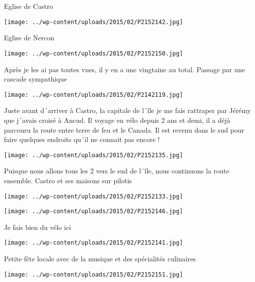  \newline
 Eglise de Castro \newline
 \newline
\centerline{\texttt{[image: ../wp-content/uploads/2015/02/P2152142.jpg]} } 
 \newline
 Eglise de Nercon \newline
 \newline
\centerline{\texttt{[image: ../wp-content/uploads/2015/02/P2152150.jpg]} } 
 \newline
 Après je les ai pas toutes vues, il y en a une vingtaine au total. \newline
 Passage par une cascade sympathique \newline
 \newline
\centerline{\texttt{[image: ../wp-content/uploads/2015/02/P2142119.jpg]} } 
 \newline
 Juste avant d´arriver à Castro, la capitale de l´île je me fais rattraper par Jérémy que j´avais croisé à Ancud. Il voyage en vélo depuis 2 ans et demi, il a déjà parcouru la route entre terre de feu et le Canada. Il est revenu dans le sud pour faire quelques endroits qu´il ne connait pas encore ! \newline
 \newline
\centerline{\texttt{[image: ../wp-content/uploads/2015/02/P2152135.jpg]} } 
 \newline
 Puisque nous allons tous les 2 vers le sud de l´île, nous continuons la route ensemble. \newline
 Castro et ses maisons sur pilotis \newline
 \newline
\centerline{\texttt{[image: ../wp-content/uploads/2015/02/P2152133.jpg]} } 
 \newline
 \newline
\centerline{\texttt{[image: ../wp-content/uploads/2015/02/P2152146.jpg]} } 
 \newline
 Je fais bien du vélo ici \newline
 \newline
\centerline{\texttt{[image: ../wp-content/uploads/2015/02/P2152141.jpg]} } 
 \newline
 Petite fête locale avec de la musique et des spécialités culinaires \newline
 \newline
\centerline{\texttt{[image: ../wp-content/uploads/2015/02/P2152151.jpg]} } 
